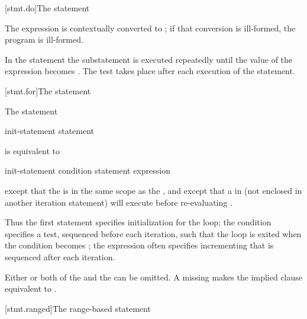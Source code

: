 [stmt.do]{The  statement}%

\pnum
The expression is contextually converted to ;
if that conversion is ill-formed, the program is ill-formed.

\pnum
In the  statement the substatement is executed repeatedly
until the value of the expression becomes . The test takes
place after each execution of the statement.

[stmt.for]{The  statement}%

\pnum
The  statement
\begin{ncsimplebnf}
 \terminal{(} init-statement  \terminal{;}  \terminal{)} statement
\end{ncsimplebnf}
is equivalent to
\begin{ncsimplebnf}
\terminal{\{}\br
\bnfindent init-statement\br
\bnfindent {} \terminal{(} condition \terminal{)} \terminal{\{}\br
\bnfindent\bnfindent statement\br
\bnfindent\bnfindent expression \terminal{;}\br
\bnfindent \terminal{\}}\br
\terminal{\}}
\end{ncsimplebnf}
except that the  is
in the same scope as the , and
except that a
%
 in  (not enclosed in another
iteration statement) will execute  before
re-evaluating .
\begin{note}
Thus the first statement specifies initialization for the loop; the
condition specifies a test, sequenced before each
iteration, such that the loop is exited when the condition becomes
; the expression often specifies incrementing that is
sequenced after each iteration.
\end{note}

\pnum
Either or both of the 
and the  can be omitted.
A missing 
makes the implied  clause
equivalent to .

[stmt.ranged]{The range-based  statement}%

